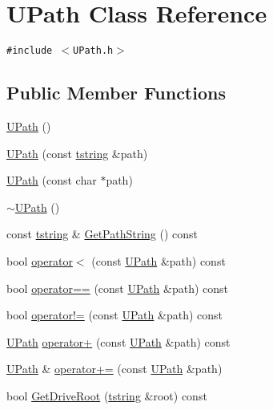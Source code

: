 \hypertarget{class_u_path}{
\section{UPath Class Reference}
\label{class_u_path}
}
{\tt \#include $<$UPath.h$>$}

\subsection*{Public Member Functions}
\begin{CompactItemize}
\item 
\hyperlink{class_u_path_46ed5eebdbc67d7603a43d2e62c279ae}{UPath} ()
\item 
\hyperlink{class_u_path_6a7dc514e2d2ab892b1d9e7e68a35a7d}{UPath} (const \hyperlink{common__afx_8h_816fa58fd77499b0edb2c69ebe803d5c}{tstring} \&path)
\item 
\hyperlink{class_u_path_9eea4f4ccc45d8cede172251da61b3da}{UPath} (const char $\ast$path)
\item 
\hyperlink{class_u_path_0976c621ce738265f5c694d8364f782a}{$\sim$UPath} ()
\item 
const \hyperlink{common__afx_8h_816fa58fd77499b0edb2c69ebe803d5c}{tstring} \& \hyperlink{class_u_path_970648bc09145c6da1712022d84ad3b7}{GetPathString} () const 
\item 
bool \hyperlink{class_u_path_e057c5273fcc56515e04ca0aac2d09e0}{operator$<$} (const \hyperlink{class_u_path}{UPath} \&path) const 
\item 
bool \hyperlink{class_u_path_24dac9415fb7ab9696e94a3a0f6ba61b}{operator==} (const \hyperlink{class_u_path}{UPath} \&path) const 
\item 
bool \hyperlink{class_u_path_cf7b322fa5654166f9d9dd7fd87a26f3}{operator!=} (const \hyperlink{class_u_path}{UPath} \&path) const 
\item 
\hyperlink{class_u_path}{UPath} \hyperlink{class_u_path_95727350cec441edb157e9e7a0faaf46}{operator+} (const \hyperlink{class_u_path}{UPath} \&path) const 
\item 
\hyperlink{class_u_path}{UPath} \& \hyperlink{class_u_path_2781fca7f2df94013f4c93ff85758929}{operator+=} (const \hyperlink{class_u_path}{UPath} \&path)
\item 
bool \hyperlink{class_u_path_62269e2268224f6a81c28ab0a296530a}{GetDriveRoot} (\hyperlink{common__afx_8h_816fa58fd77499b0edb2c69ebe803d5c}{tstring} \&root) const 
\end{CompactItemize}


